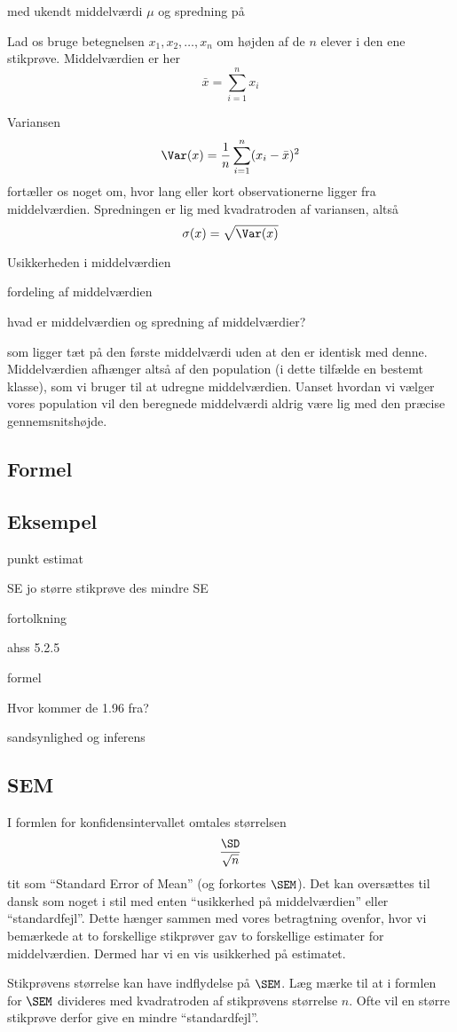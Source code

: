 
med ukendt middelværdi
\(\mu\) og spredning på \(\)

Lad os bruge betegnelsen \(x_1, x_2, \ldots, x_n\) om højden af de \(n\) elever i
den ene stikprøve. Middelværdien er her
\begin{equation}
  \bar{x} = \sum_{i=1}^n x_i
\end{equation}

Variansen
\begin{equation}
  \Var(x) = \frac{1}{n} \sum_{i=1}^n (x_i - \bar{x})^2
\end{equation}
fortæller os noget om, hvor lang eller kort observationerne ligger fra
middelværdien. Spredningen er lig med kvadratroden af variansen, altså
\begin{equation}
  \sigma(x) = \sqrt{\Var(x)}
\end{equation}

Usikkerheden i middelværdien

fordeling af middelværdien

hvad er middelværdien og spredning af middelværdier?


som ligger tæt på den første
middelværdi uden at den er identisk med denne. Middelværdien afhænger altså af den population (i dette tilfælde en bestemt klasse), som vi bruger til at udregne middelværdien. Uanset hvordan vi vælger vores population vil den beregnede middelværdi aldrig være lig med den præcise gennemsnitshøjde.
\subsection{Formel}

\subsection{Eksempel}



punkt estimat

SE
jo større stikprøve des mindre SE


fortolkning

ahss
5.2.5



formel


Hvor kommer de 1.96 fra?


sandsynlighed og inferens



\subsection{SEM}
I formlen for konfidensintervallet omtales størrelsen
\begin{equation}
\frac{\SD}{\sqrt{n}}
\end{equation}
tit som ``Standard Error of Mean'' (og forkortes \(\SEM\)). Det kan oversættes til dansk
som noget i stil med enten ``usikkerhed på middelværdien'' eller ``standardfejl''.
Dette hænger sammen med vores betragtning ovenfor, hvor vi bemærkede at to
forskellige stikprøver gav to forskellige estimater for middelværdien. Dermed har
vi en vis usikkerhed på estimatet.

Stikprøvens størrelse kan have indflydelse på \(\SEM\). Læg mærke til at i formlen for
\(\SEM\) divideres med kvadratroden af stikprøvens størrelse \(n\). Ofte vil en
større stikprøve derfor give en mindre ``standardfejl''.




